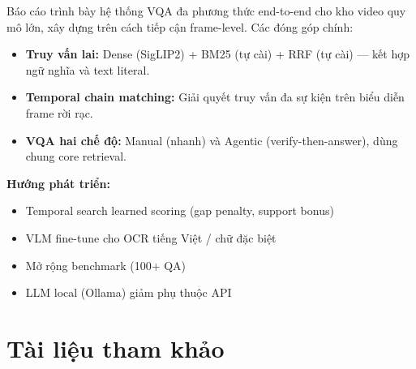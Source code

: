 \documentclass[12pt,a4paper,onecolumn]{article}
\begin{document}
Báo cáo trình bày hệ thống VQA đa phương thức end-to-end cho kho video quy mô lớn, xây dựng trên cách tiếp cận frame-level. Các đóng góp chính:

\begin{itemize}
  \item \textbf{Truy vấn lai:} Dense (SigLIP2) + BM25 (tự cài) + RRF (tự cài) — kết hợp ngữ nghĩa và text literal.
  \item \textbf{Temporal chain matching:} Giải quyết truy vấn đa sự kiện trên biểu diễn frame rời rạc.
  \item \textbf{VQA hai chế độ:} Manual (nhanh) và Agentic (verify-then-answer), dùng chung core retrieval.
\end{itemize}


\textbf{Hướng phát triển:}

\begin{itemize}
  \item Temporal search learned scoring (gap penalty, support bonus)
  \item VLM fine-tune cho OCR tiếng Việt / chữ đặc biệt
  \item Mở rộng benchmark (100+ QA)
  \item LLM local (Ollama) giảm phụ thuộc API
\end{itemize}


\section*{Tài liệu tham khảo}
\end{document}
